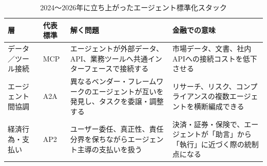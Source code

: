 \begin{table}[htbp]
\centering
\small
\caption{2024〜2026年に立ち上がったエージェント標準化スタック}
\label{tab:intro-agent-standards}
\begin{tabular}{@{}p{22mm}p{34mm}p{50mm}p{34mm}@{}}
\toprule
\textbf{層} & \textbf{代表標準} & \textbf{解く問題} & \textbf{金融での意味} \\
\midrule
データ／ツール接続 & MCP \cite{x01anthropic2024mcp,x01openai2025responsesmcp} & エージェントが外部データ、API、業務ツールへ共通インターフェースで接続する & 市場データ、文書、社内APIへの接続コストを低下させる \\
エージェント間協調 & A2A \cite{x01google2025a2a,x01linuxfoundation2026a2a} & 異なるベンダー・フレームワークのエージェントが互いを発見し、タスクを委譲・調整する & リサーチ、リスク、コンプライアンスの複数エージェントを横断編成できる \\
経済行為・支払い & AP2 \cite{x01google2025ap2,x01linuxfoundation2026a2a} & ユーザー委任、真正性、責任分界を保ちながらエージェント主導の支払いを扱う & 決済・証券・保険で、エージェントが「助言」から「執行」に近づく際の統制点になる \\
\bottomrule
\end{tabular}
\end{table}


